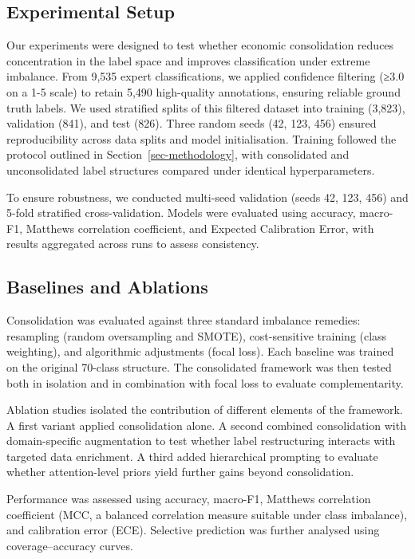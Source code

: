 \documentclass[
  a4paper,
]{article}
\begin{document}
\subsection{Experimental Setup}\label{experimental-setup}

Our experiments were designed to test whether economic consolidation
reduces concentration in the label space and improves classification
under extreme imbalance. From 9,535 expert classifications, we applied
confidence filtering (≥3.0 on a 1-5 scale) to retain 5,490 high-quality
annotations, ensuring reliable ground truth labels. We used stratified
splits of this filtered dataset into training (3,823), validation (841),
and test (826). Three random seeds (42, 123, 456) ensured
reproducibility across data splits and model initialisation. Training
followed the protocol outlined in Section~\ref{sec-methodology}, with
consolidated and unconsolidated label structures compared under
identical hyperparameters.

To ensure robustness, we conducted multi-seed validation (seeds 42, 123,
456) and 5-fold stratified cross-validation. Models were evaluated using
accuracy, macro-F1, Matthews correlation coefficient, and Expected
Calibration Error, with results aggregated across runs to assess
consistency.

\subsection{Baselines and Ablations}\label{baselines-and-ablations}

Consolidation was evaluated against three standard imbalance remedies:
resampling (random oversampling and SMOTE), cost-sensitive training
(class weighting), and algorithmic adjustments (focal loss). Each
baseline was trained on the original 70-class structure. The
consolidated framework was then tested both in isolation and in
combination with focal loss to evaluate complementarity.

Ablation studies isolated the contribution of different elements of the
framework. A first variant applied consolidation alone. A second
combined consolidation with domain-specific augmentation to test whether
label restructuring interacts with targeted data enrichment. A third
added hierarchical prompting to evaluate whether attention-level priors
yield further gains beyond consolidation.

Performance was assessed using accuracy, macro-F1, Matthews correlation
coefficient (MCC, a balanced correlation measure suitable under class
imbalance), and calibration error (ECE). Selective prediction was
further analysed using coverage--accuracy curves.
\end{document}
